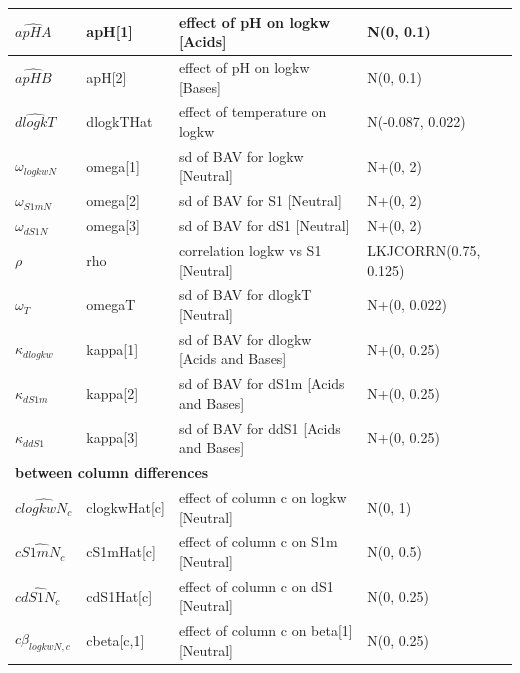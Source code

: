 \documentclass[
]{article}
\begin{document}
\begin{longtable}[t]{l|l|l|l}
\hline
\hspace{1em}$\widehat{apHA}$ & apH[1] & effect of pH on logkw [Acids] & N(0, 0.1)\\
\hline
\hspace{1em}$\widehat{apHB}$ & apH[2] & effect of pH on logkw [Bases] & N(0, 0.1)\\
\hline
\hspace{1em}$\widehat{dlogkT}$ & dlogkTHat & effect of temperature on logkw & N(-0.087, 0.022)\\
\hline
\hspace{1em}$\omega_{logkwN}$ & omega[1] & sd of BAV for logkw [Neutral] & N+(0, 2)\\
\hline
\hspace{1em}$\omega_{S1mN}$ & omega[2] & sd of BAV for S1 [Neutral] & N+(0, 2)\\
\hline
\hspace{1em}$\omega_{dS1N}$ & omega[3] & sd of BAV for dS1 [Neutral] & N+(0, 2)\\
\hline
\hspace{1em}$\rho$ & rho & correlation logkw vs S1 [Neutral] & LKJCORRN(0.75, 0.125)\\
\hline
\hspace{1em}$\omega_T$ & omegaT & sd of BAV for dlogkT [Neutral] & N+(0, 0.022)\\
\hline
\hspace{1em}$\kappa_{dlogkw}$ & kappa[1] & sd of BAV for dlogkw [Acids and Bases] & N+(0, 0.25)\\
\hline
\hspace{1em}$\kappa_{dS1m}$ & kappa[2] & sd of BAV for dS1m [Acids and Bases] & N+(0, 0.25)\\
\hline
\hspace{1em}$\kappa_{ddS1}$ & kappa[3] & sd of BAV for ddS1 [Acids and Bases] & N+(0, 0.25)\\
\hline
\multicolumn{4}{l}{\textbf{between column differences}}\\
\hline
\hspace{1em}$\widehat{clogkwN_c}$ & clogkwHat[c] & effect of column c on logkw [Neutral] & N(0, 1)\\
\hline
\hspace{1em}$\widehat{cS1mN_c}$ & cS1mHat[c] & effect of column c on S1m [Neutral] & N(0, 0.5)\\
\hline
\hspace{1em}$\widehat{cdS1N_c}$ & cdS1Hat[c] & effect of column c on dS1 [Neutral] & N(0, 0.25)\\
\hline
\hspace{1em}$c\beta_{logkwN,c}$ & cbeta[c,1] & effect of column c on beta[1] [Neutral] & N(0, 0.25)\\

\end{longtable}
\end{document}

